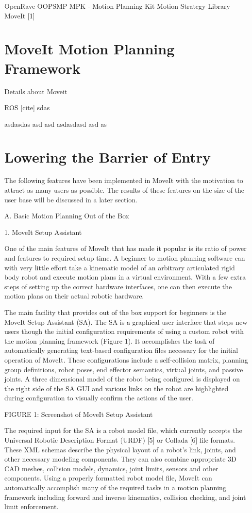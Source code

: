\documentclass[10pt,journal,compsoc]{joser1}
\begin{document}
{OpenRave
OOPSMP
MPK - Motion Planning Kit
Motion Strategy Library
MoveIt [1]

\section{MoveIt Motion Planning Framework}

Details about Moveit

ROS [cite] sdas

asdasdas asd asd asdasdasd asd as

\section{Lowering the Barrier of Entry}

The following features have been implemented in MoveIt with the motivation to attract as many users as possible. The results of these features on the size of the user base will be discussed in a later section.

A. Basic Motion Planning Out of the Box

1. MoveIt Setup Assistant

One of the main features of MoveIt that has made it popular is its ratio of power and features to required setup time. A beginner to motion planning software can with very little effort take a kinematic model of an arbitrary articulated rigid body robot and execute motion plans in a virtual environment. With a few extra steps of setting up the correct hardware interfaces, one can then execute the motion plans on their actual robotic hardware.

The main facility that provides out of the box support for beginners is the MoveIt Setup Assistant (SA). The SA is a graphical user interface that steps new users though the initial configuration requirements of using a custom robot with the motion planning framework (Figure 1). It accomplishes the task of automatically generating text-based configuration files necessary for the initial operation of MoveIt. These configurations include a self-collision matrix, planning group definitions, robot poses, end effector semantics, virtual joints, and passive joints. A three dimensional model of the robot being configured is displayed on the right side of the SA GUI and various links on the robot are highlighted during configuration to visually confirm the actions of the user.

FIGURE 1: Screenshot of MoveIt Setup Assistant

The required input for the SA is a robot model file, which currently accepts the Universal Robotic Description Format (URDF) [5] or Collada [6] file formats. These XML schemas describe the physical layout of a robot's link, joints, and other necessary modeling components. They can also combine appropriate 3D CAD meshes, collision models, dynamics, joint limits, sensors and other components. Using a properly formatted robot model file, MoveIt can automatically accomplish many of the required tasks in a motion planning framework including forward and inverse kinematics, collision checking, and joint limit enforcement.

}
\end{document}
